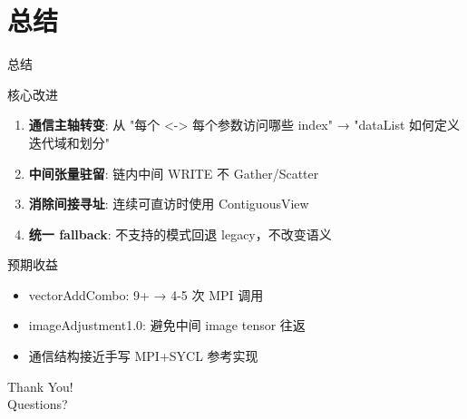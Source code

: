 \documentclass[aspectratio=169,10pt]{beamer}
\begin{document}
\section{总结}
\begin{frame}{总结}
\begin{block}{核心改进}
\begin{enumerate}
    \item \textbf{通信主轴转变}: 从 "每个 <-> 每个参数访问哪些 index" → "dataList 如何定义迭代域和划分"
    \item \textbf{中间张量驻留}: 链内中间 WRITE 不 Gather/Scatter
    \item \textbf{消除间接寻址}: 连续可直访时使用 ContiguousView
    \item \textbf{统一 fallback}: 不支持的模式回退 legacy，不改变语义
\end{enumerate}
\end{block}

\bigskip
\begin{block}{预期收益}
\begin{itemize}
    \item vectorAddCombo: 9+ → 4-5 次 MPI 调用
    \item imageAdjustment1.0: 避免中间 image tensor 往返
    \item 通信结构接近手写 MPI+SYCL 参考实现
\end{itemize}
\end{block}
\end{frame}

\begin{frame}
\begin{center}
\Large Thank You! \\
\bigskip
\large Questions?
\end{center}
\end{frame}
\end{document}
